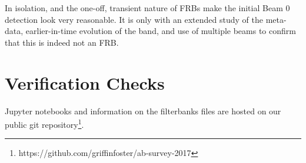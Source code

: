 \documentclass[a4paper,fleqn,usenatbib]{mnras}
\begin{document}
In isolation, and the one-off, transient nature of FRBs make the initial Beam 0
detection look very reasonable. It is only with an extended study of the
meta-data, earlier-in-time evolution of the band, and use of multiple beams to
confirm that this is indeed not an FRB.

\section{Verification Checks}







Jupyter notebooks and information on the filterbanks files are hosted on our
public git repository\footnote{https://github.com/griffinfoster/ab-survey-2017}.


 

\bsp	%
\label{lastpage}
\end{document}
